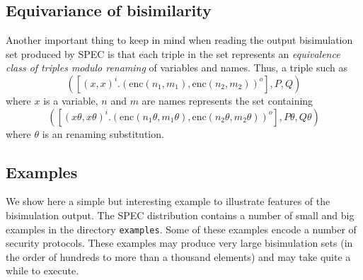 \documentclass{article}
\begin{document}
\subsection{Equivariance of bisimilarity}

Another important thing to keep in mind when reading the output bisimulation set
produced by SPEC is that each triple in the set represents an
{\em equivalence class of triples modulo renaming} of variables and names. Thus, a triple such as 
$$
([(x,x)^i.(\mathrm{enc}(n_1,m_1), \mathrm{enc}(n_2,m_2))^o], P, Q)
$$
where $x$ is a variable, $n$ and $m$ are names represents the set containing 
$$
([(x\theta,x\theta)^i.(\mathrm{enc}(n_1\theta,m_1\theta), \mathrm{enc}(n_2\theta,m_2\theta))^o], P\theta, Q\theta)
$$
where $\theta$ is an renaming substitution.

\subsection{Examples}


We show here a simple but interesting example to illustrate features of the bisimulation output. 
The SPEC distribution contains a number of small and big examples in the directory \texttt{examples}.
Some of these examples encode a number of security protocols. These examples may produce
very large bisimulation sets (in the order of hundreds to more than a thousand elements) 
and may take quite a while to execute.
\end{document}
